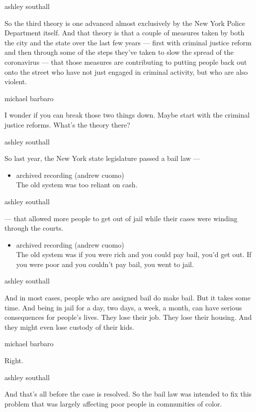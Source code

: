 ashley southall

So the third theory is one advanced almost exclusively by the New York
Police Department itself. And that theory is that a couple of measures
taken by both the city and the state over the last few years --- first
with criminal justice reform and then through some of the steps they've
taken to slow the spread of the coronavirus --- that those measures are
contributing to putting people back out onto the street who have not
just engaged in criminal activity, but who are also violent.

michael barbaro

I wonder if you can break those two things down. Maybe start with the
criminal justice reforms. What's the theory there?

ashley southall

So last year, the New York state legislature passed a bail law ---

\begin{itemize}
\tightlist
\item
  archived recording (andrew cuomo)\\
  The old system was too reliant on cash.
\end{itemize}

ashley southall

--- that allowed more people to get out of jail while their cases were
winding through the courts.

\begin{itemize}
\tightlist
\item
  archived recording (andrew cuomo)\\
  The old system was if you were rich and you could pay bail, you'd get
  out. If you were poor and you couldn't pay bail, you went to jail.
\end{itemize}

ashley southall

And in most cases, people who are assigned bail do make bail. But it
takes some time. And being in jail for a day, two days, a week, a month,
can have serious consequences for people's lives. They lose their job.
They lose their housing. And they might even lose custody of their kids.

michael barbaro

Right.

ashley southall

And that's all before the case is resolved. So the bail law was intended
to fix this problem that was largely affecting poor people in
communities of color.

